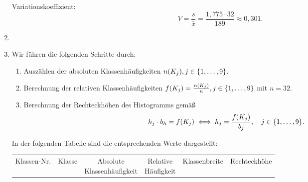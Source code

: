 \documentclass{exercise}
\begin{document}
\begin{enumerate}
        Variationskoeffizient:
        \[
            V = \frac{s}{\bar{x}} = \frac{1,775 \cdot 32}{189} \approx 0,301.
        \]
        \item \,
        \begin{center}
        \end{center}
        \item Wir führen die folgenden Schritte durch:
        \begin{enumerate}
            \item Auszählen der absoluten Klassenhäufigkeiten \(n\parentheses*{K_j}, j \in \braces*{1, \ldots, 9}\).
            \item Berechnung der relativen Klassenhäufigkeiten \(f\parentheses*{K_j} = \frac{n\parentheses*{K_j}}{n}, j \in \braces*{1, \ldots, 9}\) mit \(n = 32\).
            \item Berechnung der Rechteckhöhen des Histogramms gemäß
            \[
                h_j \cdot b_h = f\parentheses*{K_j} \iff h_j = \frac{f\parentheses*{K_j}}{b_j}, \quad j \in \braces*{1, \ldots, 9}.
            \]
        \end{enumerate}
        In der folgenden Tabelle sind die entsprechenden Werte dargestellt:
        \begin{center}
            \begin{tabular}{cccccc}
                \toprule
                Klassen-Nr. & Klasse & \makecell{Absolute\\Klassenhäufigkeit} & \makecell{Relative\\Häufigkeit} & Klassenbreite & Rechteckhöhe\\

\end{tabular}
\end{center}
\end{enumerate}
\end{document}

